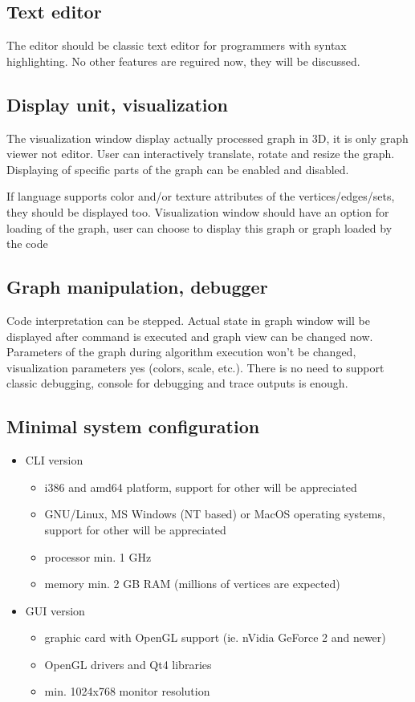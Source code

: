 \documentclass[11pt,twoside,a4paper]{book}
\begin{document}
\subsection{Text editor}

The editor should be classic text editor for programmers with syntax highlighting. No other features are reguired now, they will be discussed.


\subsection{Display unit, visualization}

The visualization window display actually processed graph in 3D, it is only graph viewer not editor. User can interactively translate, rotate and resize the graph. Displaying of specific parts of the graph can be enabled and disabled.

If language supports color and/or texture attributes of the vertices/edges/sets, they should be displayed too. Visualization window should have an option for loading of the graph, user can choose to display this graph or graph loaded by the code


\subsection{Graph manipulation, debugger}

Code interpretation can be stepped. Actual state in graph window will be displayed after command is executed and graph view can be changed now. Parameters of the graph during algorithm execution won't be changed, visualization parameters yes (colors, scale, etc.). There is no need to support classic debugging, console for debugging and trace outputs is enough.


\subsection{Minimal system configuration}

\begin{itemize}
	\item CLI version
		\begin{itemize}
		\item i386 and amd64 platform, support for other will be appreciated
		\item GNU/Linux, MS Windows (NT based) or MacOS operating systems, support for other will be appreciated
		\item processor min. 1 GHz
		\item memory min. 2 GB RAM (millions of vertices are expected)
		\end{itemize}

	\item GUI version
		\begin{itemize}
		\item graphic card with OpenGL support (ie. nVidia GeForce 2 and newer)
		\item OpenGL drivers and Qt4 libraries
		\item min. 1024x768 monitor resolution
		\end{itemize}
\end{itemize}
\end{document}
